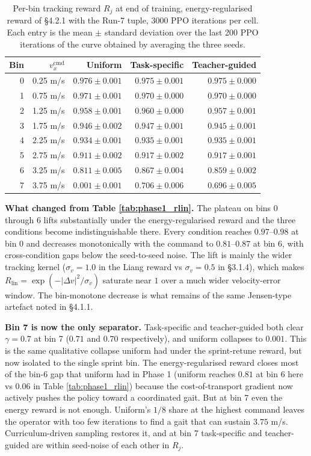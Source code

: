 \begin{table}[ht]
\centering
\begin{tabularx}{\textwidth}{@{}r r r r r@{}}
\toprule
\textbf{Bin} & $v_x^{\mathrm{cmd}}$ & \textbf{Uniform} & \textbf{Task-specific} & \textbf{Teacher-guided} \\
\midrule
0 & 0.25 m/s & $0.976 \pm 0.001$ & $0.975 \pm 0.001$ & $0.975 \pm 0.000$ \\
1 & 0.75 m/s & $0.971 \pm 0.001$ & $0.970 \pm 0.000$ & $0.970 \pm 0.000$ \\
2 & 1.25 m/s & $0.958 \pm 0.001$ & $0.960 \pm 0.000$ & $0.957 \pm 0.001$ \\
3 & 1.75 m/s & $0.946 \pm 0.002$ & $0.947 \pm 0.001$ & $0.945 \pm 0.001$ \\
4 & 2.25 m/s & $0.934 \pm 0.001$ & $0.935 \pm 0.001$ & $0.935 \pm 0.001$ \\
5 & 2.75 m/s & $0.911 \pm 0.002$ & $0.917 \pm 0.002$ & $0.917 \pm 0.001$ \\
6 & 3.25 m/s & $0.811 \pm 0.005$ & $0.867 \pm 0.004$ & $0.859 \pm 0.002$ \\
7 & 3.75 m/s & $0.001 \pm 0.001$ & $0.706 \pm 0.006$ & $0.696 \pm 0.005$ \\
\bottomrule
\end{tabularx}
\caption{Per-bin tracking reward $R_j$ at end of training, energy-regularised reward of \S4.2.1 with the Run-7 tuple, 3000 PPO iterations per cell. Each entry is the mean $\pm$ standard deviation over the last 200 PPO iterations of the curve obtained by averaging the three seeds.}
\label{tab:phase2_rlin}
\end{table}

\textbf{What changed from Table \ref{tab:phase1_rlin}.} The plateau on bins 0 through 6 lifts substantially under the energy-regularised reward and the three conditions become indistinguishable there. Every condition reaches $0.97$--$0.98$ at bin 0 and decreases monotonically with the command to $0.81$--$0.87$ at bin 6, with cross-condition gaps below the seed-to-seed noise. The lift is mainly the wider tracking kernel ($\sigma_v = 1.0$ in the Liang reward vs $\sigma_v = 0.5$ in \S3.1.4), which makes $R_{\mathrm{lin}} = \exp(-|\Delta v|^2/\sigma_v)$ saturate near $1$ over a much wider velocity-error window. The bin-monotone decrease is what remains of the same Jensen-type artefact noted in \S4.1.1.

\textbf{Bin 7 is now the only separator.} Task-specific and teacher-guided both clear $\gamma = 0.7$ at bin 7 ($0.71$ and $0.70$ respectively), and uniform collapses to $0.001$. This is the same qualitative collapse uniform had under the sprint-retune reward, but now isolated to the single sprint bin. The energy-regularised reward closes most of the bin-6 gap that uniform had in Phase 1 (uniform reaches $0.81$ at bin 6 here vs $0.06$ in Table \ref{tab:phase1_rlin}) because the cost-of-transport gradient now actively pushes the policy toward a coordinated gait. But at bin 7 even the energy reward is not enough. Uniform's $1/8$ share at the highest command leaves the operator with too few iterations to find a gait that can sustain $3.75$ m/s. Curriculum-driven sampling restores it, and at bin 7 task-specific and teacher-guided are within seed-noise of each other in $R_j$.

